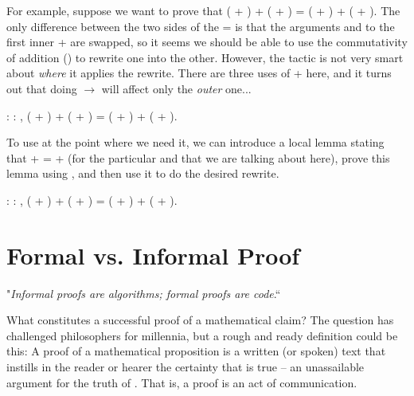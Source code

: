 \documentclass[12pt]{report}
\begin{document}
 For example, suppose we want to prove that ( + ) + ( + )
    = ( + ) + ( + ). The only difference between the two sides of
    the = is that the arguments  and  to the first inner +
    are swapped, so it seems we should be able to use the
    commutativity of addition () to rewrite one into the
    other.  However, the  tactic is not very smart about
    \textit{where} it applies the rewrite.  There are three uses of + here,
    and it turns out that doing  \ensuremath{\rightarrow}  will affect
    only the \textit{outer} one... \begin{coqdoccode}
\coqdocemptyline
\coqdocnoindent
{}  : \coqdockw{\ensuremath{\forall}}     : ,\coqdoceol
\coqdocindent{1.00em}
( + ) + ( + ) = ( + ) + ( + ).\coqdoceol
\coqdocemptyline
\end{coqdoccode}
To use  at the point where we need it, we can introduce
    a local lemma stating that  +  =  +  (for the particular 
    and  that we are talking about here), prove this lemma using
    , and then use it to do the desired rewrite. \begin{coqdoccode}
\coqdocemptyline
\coqdocnoindent
{}  : \coqdockw{\ensuremath{\forall}}     : ,\coqdoceol
\coqdocindent{1.00em}
( + ) + ( + ) = ( + ) + ( + ).\coqdoceol
\coqdocemptyline
\end{coqdoccode}
\section{Formal vs. Informal Proof}



 "\textit{Informal proofs are algorithms; formal proofs are code}.`` 

 What constitutes a successful proof of a mathematical claim?
    The question has challenged philosophers for millennia, but a
    rough and ready definition could be this: A proof of a
    mathematical proposition  is a written (or spoken) text that
    instills in the reader or hearer the certainty that  is true --
    an unassailable argument for the truth of .  That is, a proof
    is an act of communication.
\end{document}
